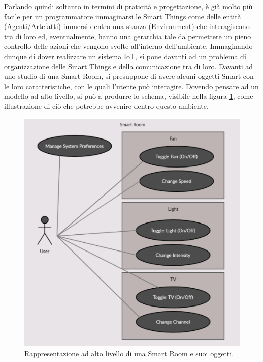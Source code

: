 \documentclass[12pt,a4paper,openright,oneside]{report}
\begin{document}
Parlando quindi soltanto in termini di praticità e progettazione, è già molto più facile per un programmatore immaginarsi le Smart Things come delle entità (Agenti/Artefatti) immersi dentro una stanza (Environment) che interagiscono tra di loro ed, eventualmente, hanno una gerarchia tale da permettere un pieno controllo delle azioni che vengono svolte all'interno dell'ambiente. Immaginando dunque di dover realizzare un sistema IoT, si pone davanti ad un problema di organizzazione delle Smart Things e della comunicazione tra di loro. Davanti ad uno studio di una Smart Room, si presuppone di avere alcuni oggetti Smart con le loro caratteristiche, con le quali l'utente può interagire. Dovendo pensare ad un modello ad alto livello, si può a produrre lo schema, visibile nella figura \ref{fig:use-case-diagram-high}, come illustrazione di ciò che potrebbe avvenire dentro questo ambiente.\\

\begin{figure}[h]
	\centering
	\includegraphics[scale=0.6]{eps/use-case-high.pdf}
	\caption{Rappresentazione ad alto livello di una Smart Room e suoi oggetti.}
	\label{fig:use-case-diagram-high}
\end{figure}
\end{document}
